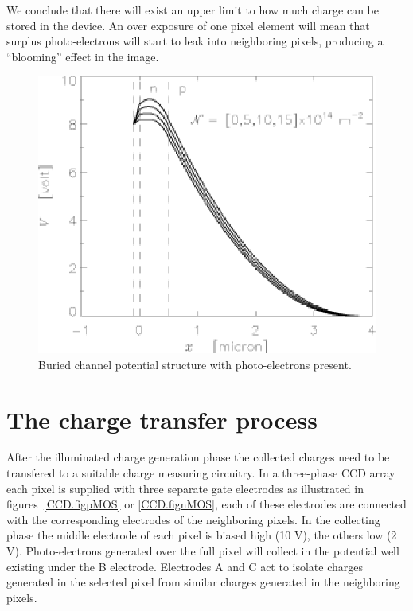 We conclude that there will exist an upper limit to how much charge
can be stored in the device. An over exposure of one pixel element
will mean that surplus photo-electrons will start to leak into
neighboring pixels, producing a ``blooming'' effect in the image.


\begin{figure}[h]
  \centering
	\includegraphics{CCD_burchanph.eps}
  \caption{Buried channel potential structure with photo-electrons present.}
  \label{CCD.figburchanph}
\end{figure}




\section{The charge transfer process} 

After the illuminated charge generation phase the collected charges
need to be transfered to a suitable charge measuring circuitry. In a
three-phase CCD array each pixel is supplied with three separate gate
electrodes as illustrated in figures~\ref{CCD.figpMOS} or
\ref{CCD.fignMOS}, each of these electrodes are connected with the
corresponding electrodes of the neighboring pixels.  In the
collecting phase the middle electrode of each pixel is biased high (10
V), the others low (2 V). Photo-electrons generated over the full pixel
will collect in the potential well existing under the B electrode.
Electrodes A and C act to isolate charges generated in the selected
pixel from similar charges generated in the neighboring pixels.

